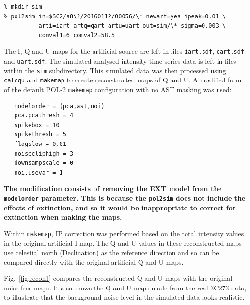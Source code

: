 \documentclass[twoside,11pt]{starlink}
\begin{document}
\begin{verbatim}
% mkdir sim
% pol2sim in=$SC2/s8\?/20160112/00056/\* newart=yes ipeak=0.01 \
          arti=iart artq=qart artu=uart out=sim/\* sigma=0.003 \
          comval1=6 comval2=58.5
\end{verbatim}

The I, Q and U maps for the artificial source are left in files
\texttt{iart.sdf}, \texttt{qart.sdf} and \texttt{uart.sdf}. The simulated
analysed intensity time-series data is left in files within the
\texttt{sim} subdirectory. This simulated data was then processed using
\texttt{calcqu} and \texttt{makemap} to create reconstructed maps of Q
and U. A modified form of the default POL-2 \texttt{makemap} configuration
with no AST masking was used:

\begin{verbatim}
   modelorder = (pca,ast,noi)
   pca.pcathresh = 4
   spikebox = 10
   spikethresh = 5
   flagslow = 0.01
   noisecliphigh = 3
   downsampscale = 0
   noi.usevar = 1
\end{verbatim}

\textbf{The modification consists of removing the EXT model from the
\texttt{modelorder} parameter. This is because the \texttt{pol2sim} does
not include the effects of extinction, and so it would be inappropriate
to correct for extinction when making the maps.}

Within \texttt{makemap}, IP correction was performed based on the total
intensity values in the original artificial I map. The Q and U values in
these reconstructed maps use celestial north (Declination) as the
reference direction and so can be compared directly with the original
artificial Q and U maps.

Fig.~\ref{fig:recon1} compares the reconstructed Q and U maps with the
original noise-free maps. It also shows the Q and U maps made from the
real 3C273 data, to illustrate that the background noise level in the
simulated data looks realistic.
\end{document}
